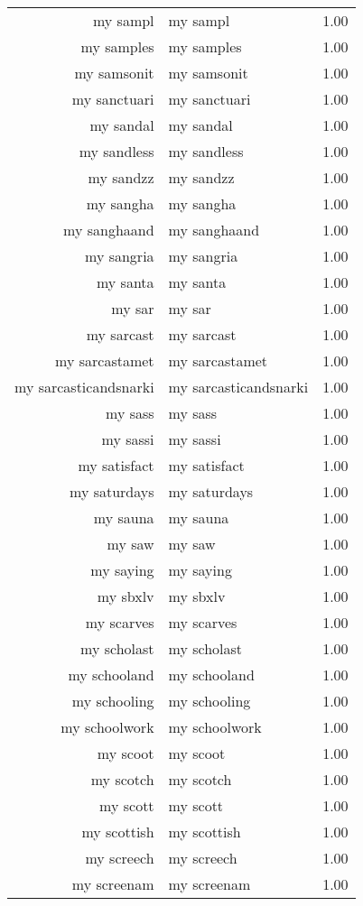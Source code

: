\begin{table}[ht]
\begin{tabular}{rlr}
  my sampl & my sampl & 1.00 \\ 
  my samples & my samples & 1.00 \\ 
  my samsonit & my samsonit & 1.00 \\ 
  my sanctuari & my sanctuari & 1.00 \\ 
  my sandal & my sandal & 1.00 \\ 
  my sandless & my sandless & 1.00 \\ 
  my sandzz & my sandzz & 1.00 \\ 
  my sangha & my sangha & 1.00 \\ 
  my sanghaand & my sanghaand & 1.00 \\ 
  my sangria & my sangria & 1.00 \\ 
  my santa & my santa & 1.00 \\ 
  my sar & my sar & 1.00 \\ 
  my sarcast & my sarcast & 1.00 \\ 
  my sarcastamet & my sarcastamet & 1.00 \\ 
  my sarcasticandsnarki & my sarcasticandsnarki & 1.00 \\ 
  my sass & my sass & 1.00 \\ 
  my sassi & my sassi & 1.00 \\ 
  my satisfact & my satisfact & 1.00 \\ 
  my saturdays & my saturdays & 1.00 \\ 
  my sauna & my sauna & 1.00 \\ 
  my saw & my saw & 1.00 \\ 
  my saying & my saying & 1.00 \\ 
  my sbxlv & my sbxlv & 1.00 \\ 
  my scarves & my scarves & 1.00 \\ 
  my scholast & my scholast & 1.00 \\ 
  my schooland & my schooland & 1.00 \\ 
  my schooling & my schooling & 1.00 \\ 
  my schoolwork & my schoolwork & 1.00 \\ 
  my scoot & my scoot & 1.00 \\ 
  my scotch & my scotch & 1.00 \\ 
  my scott & my scott & 1.00 \\ 
  my scottish & my scottish & 1.00 \\ 
  my screech & my screech & 1.00 \\ 
  my screenam & my screenam & 1.00 \\ 

\end{tabular}
\end{table}
